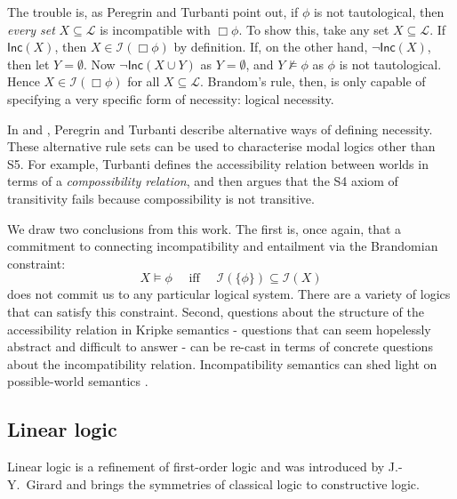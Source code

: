The trouble is, as Peregrin and Turbanti point out, if $\phi$ is not tautological, then \emph{every set} $X \subseteq \mathcal{L}$ is incompatible with $\Box \phi$.
To show this, take any set $X \subseteq \mathcal{L}$. 
If $\mathsf{Inc}(X)$, then $X \in \mathcal{I}(\Box \phi)$ by definition.
If, on the other hand, $\neg \mathsf{Inc}(X)$, then let $Y = \emptyset$.
Now $\neg \mathsf{Inc}(X \cup Y)$ as $Y = \emptyset$, and $Y \nvDash \phi$ as $\phi$ is not tautological.
Hence $X \in \mathcal{I}(\Box \phi)$ for all $X \subseteq \mathcal{L}$. 
Brandom's rule, then, is only capable of specifying a very specific form of necessity: logical necessity.

In \cite{PeregrinJ:logbasoi} and \cite{turbanti}, Peregrin and Turbanti describe alternative ways of defining necessity.
These alternative rule sets can be used to characterise modal logics other than S5.
For example, Turbanti defines the accessibility relation between worlds in terms of a \emph{compossibility relation}, and then argues that the S4 axiom of transitivity fails because compossibility is not transitive.

We draw two conclusions from this work.
The first is, once again, that a commitment to connecting incompatibility and entailment via the Brandomian constraint:
\[
X \models \phi\quad \text{ iff }\quad \mathcal{I}(\{\phi\}) \subseteq \mathcal{I}(X)
\]
does not commit us to any particular logical system. 
There are a variety of logics that can satisfy this constraint.
Second, questions about the structure of the accessibility relation in Kripke semantics - questions that can seem hopelessly abstract and difficult to answer - can be re-cast in terms of concrete questions about the incompatibility relation.
Incompatibility semantics can shed light on possible-world semantics \cite{turbanti}. 

\subsection{Linear logic}

Linear logic \cite{GirardJY:linlog} is a refinement of
first-order logic and was introduced by J.-Y.~Girard and
brings the symmetries of classical logic to constructive
logic. 

